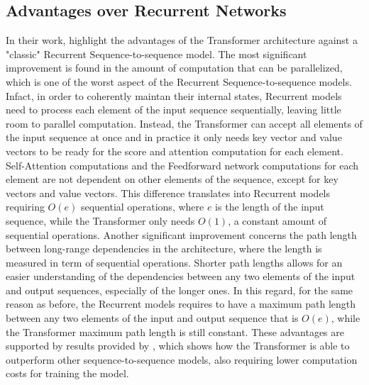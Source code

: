         \subsection{Advantages over Recurrent Networks}
        \label{selfan:adv_recur}
            In their work,  highlight the advantages of the Transformer architecture against a "classic" Recurrent Sequence-to-sequence model. \newline
            The most significant improvement is found in the amount of computation that can be parallelized, which is one of the worst aspect of the Recurrent Sequence-to-sequence models. Infact, in order to coherently maintan their internal states, Recurrent models need to process each element of the input sequence sequentially, leaving little room to parallel computation. Instead, the Transformer can accept all elements of the input sequence at once and in practice it only needs key vector and value vectors to be ready for the score and attention computation for each element. Self-Attention computations and the Feedforward network computations for each element are not dependent on other elements of the sequence, except for key vectors and value vectors. This difference translates into Recurrent models requiring $O\left(e\right)$ sequential operations, where $e$ is the length of the input sequence, while the Transformer only needs $O(1)$, a constant amount of sequential operations. \newline
            Another significant improvement concerns the path length between long-range dependencies in the architecture, where the length is measured in term of sequential operations. Shorter path lengths allows for an easier understanding of the dependencies between any two elements of the input and output sequences, especially of the longer ones. In this regard, for the same reason as before, the Recurrent models requires to have a maximum path length between any two elements of the input and output sequence that is $O\left(e\right)$, while the Transformer maximum path length is still constant. \newline
            These advantages are supported by results provided by , which shows how the Transformer is able to outperform other sequence-to-sequence models, also requiring lower computation costs for training the model.
    
    \newpage
